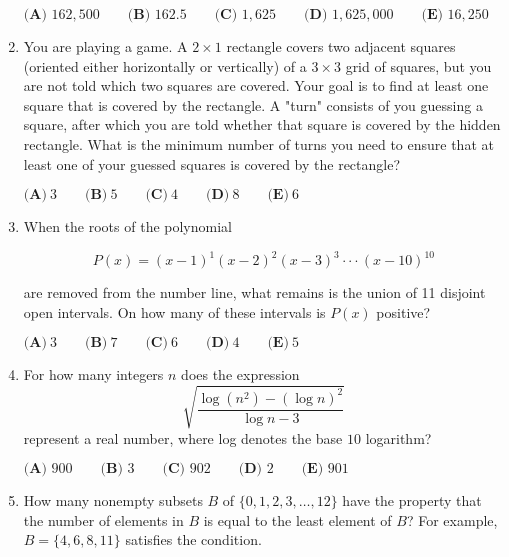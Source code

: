 \documentclass{article}
\begin{document}
\begin{enumerate}[label=\arabic*., itemsep=0.5em]
\(\textbf{(A) }162,500\qquad\textbf{(B) }162.5\qquad\textbf{(C) }1,625\qquad\textbf{(D) }1,625,000\qquad\textbf{(E) }16,250\)\par \vspace{0.5em}\item You are playing a game. A \(2 \times 1\) rectangle covers two adjacent squares (oriented either horizontally or vertically) of a \(3 \times 3\) grid of squares, but you are not told which two squares are covered. Your goal is to find at least one square that is covered by the rectangle. A "turn" consists of you guessing a square, after which you are told whether that square is covered by the hidden rectangle. What is the minimum number of turns you need to ensure that at least one of your guessed squares is covered by the rectangle?

\(\textbf{(A)}~3\qquad\textbf{(B)}~5\qquad\textbf{(C)}~4\qquad\textbf{(D)}~8\qquad\textbf{(E)}~6\)\par \vspace{0.5em}\item When the roots of the polynomial


\begin{equation*}
P(x)  = (x-1)^1 (x-2)^2 (x-3)^3 \cdot \cdot \cdot (x-10)^{10}
\end{equation*}


are removed from the number line, what remains is the union of 11 disjoint open intervals. On how many of these intervals is \(P(x)\) positive?

\(\textbf{(A)}~3\qquad\textbf{(B)}~7\qquad\textbf{(C)}~6\qquad\textbf{(D)}~4\qquad\textbf{(E)}~5\)\par \vspace{0.5em}\item For how many integers \(n\) does the expression
\begin{equation*}
\sqrt{\frac{\log (n^2) - (\log n)^2}{\log n - 3}}
\end{equation*}
represent a real number, where log denotes the base \(10\) logarithm?

\(\textbf{(A) }900 \qquad \textbf{(B) }3\qquad \textbf{(C) }902 \qquad \textbf{(D) } 2  \qquad \textbf{(E) }901\)\par \vspace{0.5em}\item How many nonempty subsets \(B\) of \(\{0, 1, 2, 3, \dots, 12\}\) have the property that the number of elements in \(B\) is equal to the least element of \(B\)? For example, \(B = \{4, 6, 8, 11\}\) satisfies the condition.


\end{enumerate}
\end{document}
